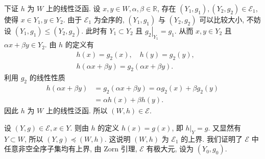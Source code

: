 \documentclass[openany]{ctexbook}
\makeatletter
\theoremstyle{kaiti}
\theoremstyle{normal}
\renewenvironment{proof}[1][\proofname]{\par
    \pushQED{\qed}%
    \normalfont \topsep6\p@\@plus6\p@\relax
    \trivlist
    \item\relax
    {\heiti #1}\hspace{2\labelsep}\ignorespaces
  }{%
    \popQED\endtrivlist\@endpefalse
  }
\makeatother
\begin{document}
\begin{proof}
下证 $h$ 为 $W$ 上的线性泛函. 设 $x, y \in W, \alpha, \beta \in \mathbb{R}$, 存在 $\left(Y_1, g_1\right),\left(Y_2, g_2\right) \in \mathcal{E}_1$, 使得 $x \in Y_1, y \in Y_2$. 由于 $\mathcal{E}_1$ 为全序的, $\left(Y_1, g_1\right)$ 与 $\left(Y_2, g_2\right)$ 可以比较大小, 不妨设 $\left(Y_1, g_1\right) \leqslant\left(Y_2, g_2\right)$. 此时有 $Y_1 \subset Y_2$ 且 $\left.g_2\right|_{Y_1}=g_1$. 从而 $x, y \in Y_2$ 且 $\alpha x+\beta y \in Y_2$. 由 $h$ 的定义有
$$
\begin{aligned}
&h(x)=g_2(x), \quad h(y)=g_2(y), \\
&h(\alpha x+\beta y)=g_2(\alpha x+\beta y).
\end{aligned}
$$
利用 $g_2$ 的线性性质
$$
\begin{aligned}
h(\alpha x+\beta y) &=g_2(\alpha x+\beta y)=\alpha g_2(x)+\beta g_2(y) \\
&=\alpha h(x)+\beta h(y).
\end{aligned}
$$
因此 $h$ 为 $W$ 上的线性泛函. 所以 $(W, h) \in \mathcal{E}$.

设 $(Y, g) \in \mathcal{E}, x \in Y$. 则由 $h$ 的定义 $h(x)=g(x)$, 即 $\left.h\right|_{Y}=g$. 又显然有 $Y \subset W$, 所以 $(Y, g) \preccurlyeq(W, h)$. 这说明 $(W, h)$ 为 $\mathcal{E}_1$ 的上界. 我们证明了 $\mathcal{E}$ 中任意非空全序子集均有上界, 由 Zorn 引理, $\mathcal{E}$ 有极大元, 设为 $\left(Y_0, g_0\right)$.


\end{proof}
\end{document}
